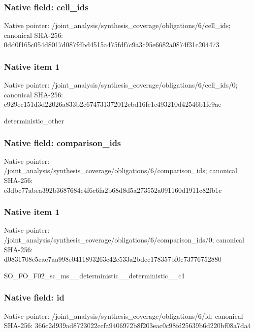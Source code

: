 \documentclass[10pt,a4paper]{article}
\begin{document}
\subsubsection{Native field: cell\_\allowbreak{}ids}
Native pointer: /joint\_\allowbreak{}analysis/synthesis\_\allowbreak{}coverage/obligations/6/cell\_\allowbreak{}ids; canonical SHA-256: 0dd0f165c054d8017d087fdbd4515a475fdf7c9a3c95e6682a0874f31c204473

\subsubsection{Native item 1}
Native pointer: /joint\_\allowbreak{}analysis/synthesis\_\allowbreak{}coverage/obligations/6/cell\_\allowbreak{}ids/0; canonical SHA-256: c929ec151d3d22026a833b2c674731372012cbd16fe1c493210d42546b1fe9ae

\begingroup\raggedright\sloppy deterministic\_\allowbreak{}other\par\endgroup

\subsubsection{Native field: comparison\_\allowbreak{}ids}
Native pointer: /joint\_\allowbreak{}analysis/synthesis\_\allowbreak{}coverage/obligations/6/comparison\_\allowbreak{}ids; canonical SHA-256: e3dbc77abea392b3687684e4f6c6fa2b68d8d5a273552a091160d1911c82fb1c

\subsubsection{Native item 1}
Native pointer: /joint\_\allowbreak{}analysis/synthesis\_\allowbreak{}coverage/obligations/6/comparison\_\allowbreak{}ids/0; canonical SHA-256: d0831708e5cac7aa998e0411893263c42c533a2bdcc178357bf0e73776752880

\begingroup\raggedright\sloppy SO\_\allowbreak{}FO\_\allowbreak{}F02\_\allowbreak{}sc\_\allowbreak{}ms\_\allowbreak{}\_\allowbreak{}deterministic\_\allowbreak{}\_\allowbreak{}deterministic\_\allowbreak{}\_\allowbreak{}c1\par\endgroup

\subsubsection{Native field: id}
Native pointer: /joint\_\allowbreak{}analysis/synthesis\_\allowbreak{}coverage/obligations/6/id; canonical SHA-256: 366c2d939ad8723022ccfa9406972b8f203eac0c98fd25639b6d220bf08a7da4
\end{document}
